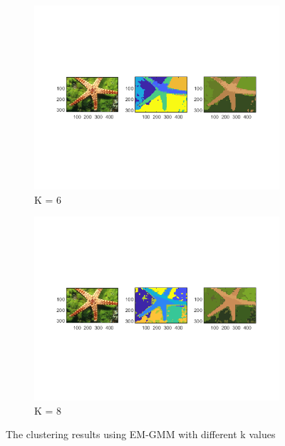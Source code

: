 \documentclass[12pt]{article}
\begin{document}
\begin{figure}[H]
\begin{subfigure}[b]{0.475\textwidth}
		\centering 
		\includegraphics[width=\textwidth]{figs/2-a-em-1-k6}
		\caption[]%
		{{\small  K = 6}}    
		\label{fig:mean and std of net34}
	\end{subfigure}
	\quad
	\begin{subfigure}[b]{0.475\textwidth}   
		\centering 
		\includegraphics[width=\textwidth]{figs/2-a-em-1-k8}
		\caption[]%
		{{\small  K = 8}}    
		\label{fig:mean and std of net44}
	\end{subfigure}
	\caption[]
	{\small The clustering results using EM-GMM with different k values} 
	\label{fig:mean and std of nets}
\end{figure}
\end{document}
